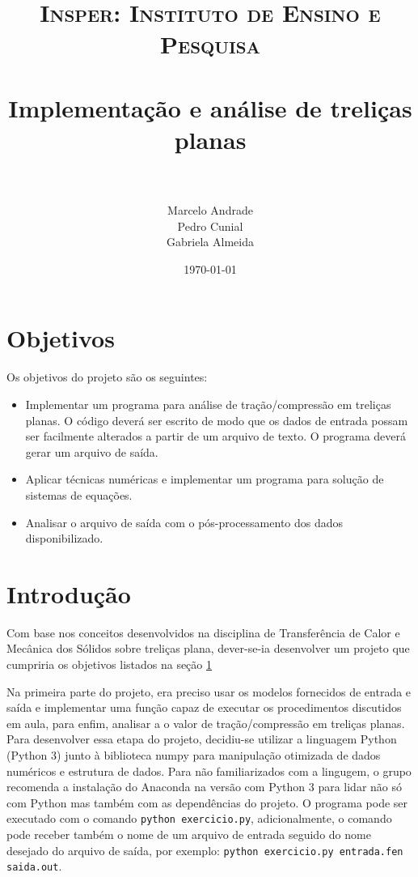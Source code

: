 \documentclass[paper=a4, fontsize=11pt]{scrartcl}
\title{
    \usefont{OT1}{bch}{b}{n}
    \normalfont \normalsize \textsc{Insper: Instituto de Ensino e Pesquisa} \\ [25pt] %
    \horrule{0.5pt} \\[0.4cm]
    \huge Implementação e análise de treliças planas \\			%
    \horrule{2pt} \\[0.5cm]
}
\author{										%
    \normalfont                 \normalsize
        Marcelo Andrade\\[-3pt]		\normalsize
    Pedro Cunial\\[-3pt]		\normalsize
        Gabriela Almeida\\[-3pt]		\normalsize
}
\date{\today}
\begin{document}
\maketitle

\newpage

\tableofcontents

\newpage


\section{Objetivos} \label{sec:objetivos}
Os objetivos do projeto são os seguintes:

\begin{itemize}
  \item Implementar um programa para análise de tração/compressão em
  treliças planas. O código deverá ser escrito de modo que os dados de entrada
  possam ser facilmente alterados a partir de um arquivo de texto. O programa deverá gerar um arquivo de saída.

  \item Aplicar técnicas numéricas e implementar um programa para
  solução de sistemas de equações.

  \item Analisar o arquivo de saída com o pós-processamento dos dados
  disponibilizado.
\end{itemize}

\section{Introdução}

Com base nos conceitos desenvolvidos na disciplina de Transferência de Calor e Mecânica dos Sólidos sobre treliças plana, dever-se-ia desenvolver um projeto que cumpriria os objetivos listados na seção \ref{sec:objetivos}

Na primeira parte do projeto, era preciso usar os modelos fornecidos de entrada
e saída e implementar uma função capaz de executar os procedimentos discutidos
em aula, para enfim, analisar a o valor de tração/compressão em treliças planas.
Para desenvolver essa etapa do projeto, decidiu-se utilizar a linguagem Python
(Python 3) junto à biblioteca numpy para manipulação otimizada de dados
numéricos e estrutura de dados. Para não familiarizados com a lingugem, o grupo
recomenda a instalação do Anaconda na versão com Python 3 para lidar não só com
Python mas também com as dependências do projeto. O programa pode ser executado
com o comando \texttt{python exercicio.py}, adicionalmente, o comando pode
receber também o nome de um arquivo de entrada seguido do nome desejado do
arquivo de saída, por exemplo: \texttt{python exercicio.py entrada.fen saida.out}.
\end{document}
